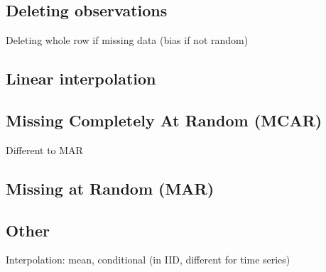 
\subsection{Deleting observations}

Deleting whole row if missing data (bias if not random)

\subsection{Linear interpolation}

\subsection{Missing Completely At Random (MCAR)}
Different to MAR

\subsection{Missing at Random (MAR)}

\subsection{Other}
Interpolation: mean, conditional (in IID, different for time series)

